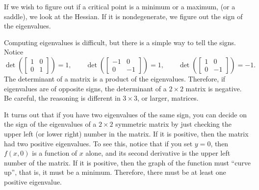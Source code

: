 \documentclass[12pt]{article}
\begin{document}
If we wish to figure out if a critical point is a minimum
or a maximum, (or a saddle), we look at the Hessian.  If it is
nondegenerate, we figure out the sign of the eigenvalues.

Computing eigenvalues is difficult, but there is a simple way to tell
the signs.  Notice
\[
\det\left(
\begin{bmatrix}
1 & 0 \\
0 & 1
\end{bmatrix}
\right) = 1,
\qquad
\det\left(
\begin{bmatrix}
-1 & 0 \\
0 & -1
\end{bmatrix}
\right) = 1,
\qquad
\det\left(
\begin{bmatrix}
1 & 0 \\
0 & -1
\end{bmatrix}
\right) = -1 .
\]
The determinant of a matrix is a product of the eigenvalues.  Therefore, if
eigenvalues are of opposite signs, the determinant of a $2 \times 2$ matrix is
negative.  Be careful, the reasoning is different in $3 \times 3$, or
larger, matrices.

It turns out that if you have two eigenvalues of the same sign, you can
decide on the sign of the eigenvalues of a $2 \times 2$ symmetric matrix by just
checking the upper left (or lower right) number in the matrix.  If it is
positive, then the matrix had two positive eigenvalues.  To see this,
notice that if you set $y=0$, then $f(x,0)$ is a
function of $x$ alone, and its second derivative is the upper left number of
the matrix.  If it is positive, then the graph of the function must ``curve
up'', that is, it must be a minimum.  Therefore, there must be at least one
positive eigenvalue.

\bigskip
\end{document}

